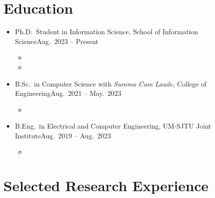 \documentclass[letterpaper,10.8pt]{article}
\begin{document}
\head%

\section{Education}

\begin{itemize}
      \item {}
            {Ph.D.\ Student in Information Science, School of Information Science}{Aug.\ 2023 -- Present}
            \begin{itemize}
                  \item {}
                  \item {}
            \end{itemize}

      \item {}
            {B.Sc.\ in Computer Science with \emph{Summa Cum Laude}, College of Engineering}{Aug.\ 2021 -- May.\ 2023}
            \begin{itemize}
                  \item {}
            \end{itemize}

      \item {}
            {B.Eng.\ in Electrical and Computer Engineering, UM-SJTU Joint Institute}{Aug.\ 2019 -- Aug.\ 2023}
            \begin{itemize}
                  \item {}
            \end{itemize}
\end{itemize}

\section{Selected Research Experience}
\end{document}
